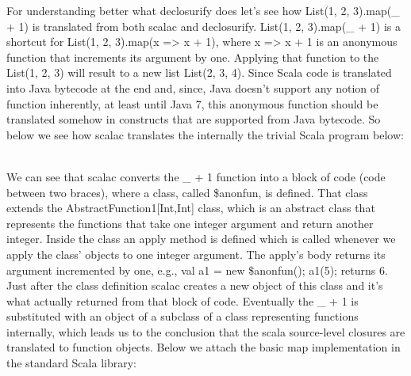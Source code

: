 For understanding better what declosurify does let's see how List(1, 2, 3).map(_
+ 1)  is translated from both scalac and declosurify.
List(1, 2, 3).map(_ + 1) is a shortcut for List(1, 2, 3).map(x => x + 1), where
x => x + 1 is an anonymous function that increments its argument by one.
Applying that function to the List(1, 2, 3) will result to a new list List(2,
3, 4). Since Scala code is translated into Java bytecode at the end and, since,
Java  doesn't support any notion of function inherently, at least until Java 7,
this anonymous function should be translated somehow in constructs that are
supported from Java bytecode. So below we see how scalac translates the
internally the trivial Scala program below:\\
 \\


We can see that scalac converts the _ + 1 function into a block of code (code
between two braces), where a class, called \$anonfun, is defined. That class
extends the AbstractFunction1[Int,Int] class, which is an abstract
class that represents the functions that take one integer argument and return
another integer. Inside the class an apply method is defined which is called
whenever we apply the class' objects to one integer argument. The apply's body
returns  its argument incremented by one,  e.g., val a1 = new \$anonfun();
a1(5); returns 6. Just after the class definition scalac creates a new object
of this class and it's what actually returned from that block of code.
Eventually the _ + 1 is substituted with an object of a subclass of a class
representing functions internally, which leads us to the conclusion that the
scala source-level closures are translated to function objects. Below we attach
the basic map implementation in the standard Scala library:

